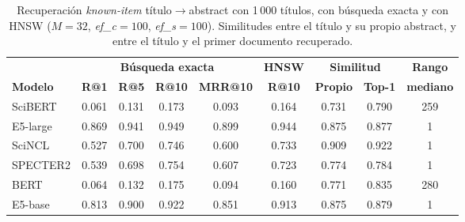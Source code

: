 \begin{table}[tbp]
\caption{Recuperación \textit{known-item} título$\rightarrow$abstract con 1\,000 títulos, con búsqueda exacta y con HNSW ($M=32$, \textit{ef\_c}$=100$, \textit{ef\_s}$=100$). Similitudes entre el título y su propio abstract, y entre el título y el primer documento recuperado.}\label{tab:naturales}
\centering
\small
\begin{tabular}{|l|c|c|c|c|c|c|c|c|}
\hline
 & \multicolumn{4}{c|}{\textbf{Búsqueda exacta}} & \textbf{HNSW} & \multicolumn{2}{c|}{\textbf{Similitud}} & \textbf{Rango} \\ \cline{2-8}
\textbf{Modelo} & \textbf{R@1} & \textbf{R@5} & \textbf{R@10} & \textbf{MRR@10} & \textbf{R@10} & \textbf{Propio} & \textbf{Top-1} & \textbf{mediano} \\
\hline
SciBERT & 0.061 & 0.131 & 0.173 & 0.093 & 0.164 & 0.731 & 0.790 & 259 \\
E5-large & 0.869 & 0.941 & 0.949 & 0.899 & 0.944 & 0.875 & 0.877 & 1 \\
SciNCL & 0.527 & 0.700 & 0.746 & 0.600 & 0.733 & 0.909 & 0.922 & 1 \\
SPECTER2 & 0.539 & 0.698 & 0.754 & 0.607 & 0.723 & 0.774 & 0.784 & 1 \\
BERT & 0.064 & 0.132 & 0.175 & 0.094 & 0.160 & 0.771 & 0.835 & 280 \\
E5-base & 0.813 & 0.900 & 0.922 & 0.851 & 0.913 & 0.875 & 0.879 & 1 \\
\hline
\end{tabular}
\end{table}
